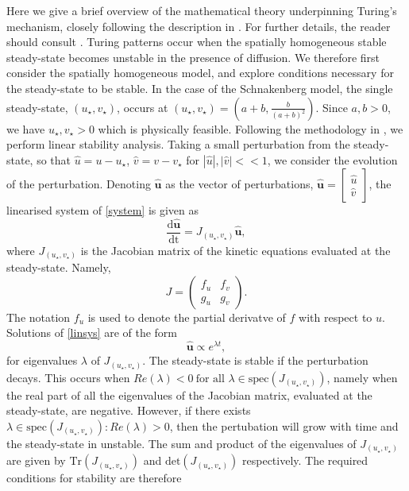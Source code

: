 \documentclass[12pt,a4paper]{report}
\begin{document}
Here we give a brief overview of the mathematical theory underpinning Turing's mechanism, closely following the description in \cite{murray}. For further details, the reader should consult \cite{murray,beentjes}. Turing patterns occur when the spatially homogeneous stable steady-state becomes unstable in the presence of diffusion. We therefore first consider the spatially homogeneous model, and explore conditions necessary for the steady-state to be stable. In the case of the Schnakenberg model, the single steady-state, $(u_\star, v_\star)$, occurs at $(u_\star, v_\star)=\left(a+b, \frac{b}{(a+b)^2}\right)$. Since $a,b>0$, we have $u_\star,v_\star>0$ which is physically feasible. Following the methodology in \cite{murray}, we perform linear stability analysis. Taking a small perturbation from the steady-state, so that $\hat{u}=u-u_\star$, $\hat{v}=v-v_\star$ for $|\hat{u}|, |\hat{v}|<<1$, we consider the evolution of the perturbation. Denoting $\hat{\textbf{u}}$ as the vector of perturbations, $\hat{\textbf{u}}=\begin{bmatrix}\hat{u} \\ \hat{v}\end{bmatrix}$, the linearised system of \eqref{system} is given as
\begin{equation}\label{linsys}
\frac{\text{d}\hat{\textbf{u}}}{\text{dt}}=J_{(u_\star,v_\star)}\hat{\textbf{u}},
\end{equation}
where $J_{(u_\star,v_\star)}$ is the Jacobian matrix of the kinetic equations evaluated at the steady-state. Namely,
$$
J=\begin{pmatrix}f_u&f_v\\g_u&g_v\end{pmatrix}.
$$
The notation $f_u$ is used to denote the partial derivatve of $f$ with respect to $u$. Solutions of \eqref{linsys} are of the form
$$
\hat{\textbf{u}}\propto e^{\lambda t},
$$
for eigenvalues $\lambda$ of $J_{(u_\star,v_\star)}$. The steady-state is stable if the perturbation decays. This occurs when $Re(\lambda)<0 \ \text{for all }   \lambda\in \text{spec}(J_{(u_\star,v_\star)})$, namely when the real part of all the eigenvalues of the Jacobian matrix, evaluated at the steady-state, are negative. However, if there exists $\lambda\in \text{spec}(J_{(u_\star,v_\star)}): Re(\lambda)>0$, then the pertubation will grow with time and the steady-state in unstable. The sum and product of the eigenvalues of $J_{(u_\star,v_\star)}$ are given by $\text{Tr}(J_{(u_\star,v_\star)})$ and $\text{det}(J_{(u_\star,v_\star)})$ respectively. The required conditions for stability are therefore
\end{document}
